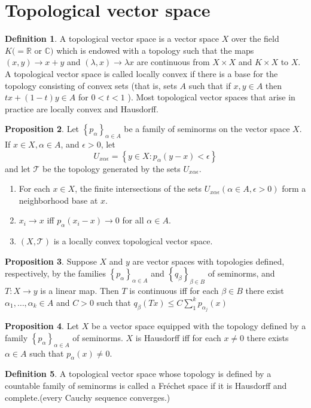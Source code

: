 \documentclass[12pt,a4paper]{book}
\newenvironment{enu}{\begin{enumerate}[(1)]}{\end{enumerate}}
\theoremstyle{definition}
\newtheorem{defn}{Definition}[section]
\newtheorem{prop}[defn]{Proposition}
\begin{document}
\section{Topological vector space}
\begin{defn}
    A topological vector space is a vector space $X$ over the field $K(=\mathbb{R}$ or $\mathbb{C})$ which is endowed with a topology such that the maps $(x, y) \rightarrow x+y$ and $(\lambda, x) \rightarrow \lambda x$ are continuous from $X \times X$ and $K \times X$ to $X$. A topological vector space is called locally convex if there is a base for the topology consisting of convex sets (that is, sets $A$ such that if $x, y \in A$ then $t x+(1-t) y \in A$ for $0<t<1$ ). Most topological vector spaces that arise in practice are locally convex and Hausdorff.
\end{defn}
\begin{prop}
    Let $\left\{p_\alpha\right\}_{\alpha \in A}$ be a family of seminorms on the vector space $X$. If $x \in X, \alpha \in A$, and $\epsilon>0$, let
    $$
    U_{x \alpha \epsilon}=\left\{y \in X: p_\alpha(y-x)<\epsilon\right\}
    $$
    and let $\mathcal{T}$ be the topology generated by the sets $U_{x \alpha \epsilon}$.
    \begin{enu} 
    \item For each $x \in X$, the finite intersections of the sets $U_{x \alpha \epsilon}(\alpha \in A, \epsilon>0)$ form a neighborhood base at $x$.
    \item $x_i \rightarrow x$ iff $p_\alpha\left(x_i-x\right) \rightarrow 0$ for all $\alpha \in A$.
    \item $(X, \mathcal{T})$ is a locally convex topological vector space.
    \end{enu}
\end{prop}
\begin{prop}
Suppose $X$ and $y$ are vector spaces with topologies defined, respectively, by the families $\left\{p_\alpha\right\}_{\alpha \in A}$ and $\left\{q_\beta\right\}_{\beta \in B}$ of seminorms, and $T: X \rightarrow y$ is a linear map. Then $T$ is continuous iff for each $\beta \in B$ there exist $\alpha_1, \ldots, \alpha_k \in A$ and $C>0$ such that $q_\beta(T x) \leq C \sum_1^k p_{\alpha_j}(x)$
\end{prop}
\begin{prop}
    Let $X$ be a vector space equipped with the topology defined by a family $\left\{p_\alpha\right\}_{\alpha \in A}$ of seminorms. $X$ is Hausdorff iff for each $x \neq 0$ there exists $\alpha \in A$ such that $p_\alpha(x) \neq 0$.
\end{prop}
\begin{defn}
    A topological vector space whose topology is defined by a countable family of seminorms is called a Fréchet space if it is Hausdorff and complete.(every Cauchy sequence converges.)
\end{defn}
\end{document}
